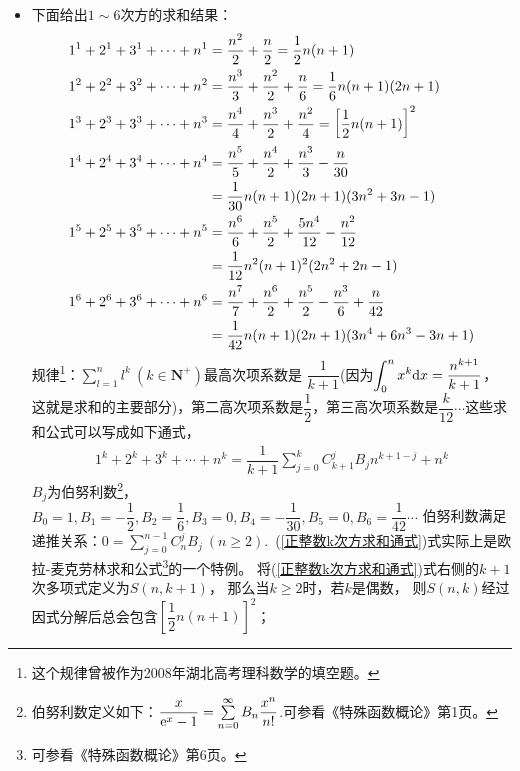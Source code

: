 \begin{itemize}[leftmargin=\inteval{\myitemleftmargin}pt,itemsep=
   \inteval{\myitemitempsep}pt,topsep=\inteval{\myitemtopsep}pt]
\item 下面给出$ 1\sim 6 $次方的求和结果：
\begin{align}
    1^1+2^1+3^1+\cdots +n^1 &=\dfrac{n^2}{2}+\dfrac{n}{2} =\dfrac{1}{2}n(n+1)
    \label{正整数1次方求和}\\
    1^2+2^2+3^2+\cdots +n^2&=\dfrac{n^3}{3}+\dfrac{n^2}{2}+\dfrac{n}{6}
    =\dfrac{1}{6}n(n+1)(2n+1)
    \label{正整数2次方求和} \\
    1^3+2^3+3^3+\cdots +n^3&=\dfrac{n^4}{4}+\dfrac{n^3}{2}+\dfrac{n^2}{4}=
    \left[\dfrac{1}{2}n(n+1) \right]^2 \label{正整数3次方求和}\\
    1^4+2^4+3^4+\cdots +n^4&=\dfrac{n^5}{5}+\dfrac{n^4}{2}+
    \dfrac{n^3}{3}-\dfrac{n}{30} 
            \label{正整数4次方求和} \\
    &=\dfrac{1}{30}n(n+1)(2n+1)(3n^2+3n-1) \notag\\
      1^5+2^5+3^5+\cdots +n^5&=\dfrac{n^6}{6}+\dfrac{n^5}{2}+
      \dfrac{5n^4}{12}-\dfrac{n^2}{12} \label{正整数5次方求和}\\
    &=\dfrac{1}{12}n^2(n+1)^2(2n^2+2n-1) \notag\\
    1^6+2^6+3^6+\cdots +n^6
    &=\dfrac{n^7}{7}+\dfrac{n^6}{2}+\dfrac{n^5}{2}-
    \dfrac{n^3}{6}+\dfrac{n}{42}
     \label{正整数6次方求和} \\
    &=\dfrac{1}{42}n(n+1)(2n+1)(3n^4+6n^3-3n+1)\notag 
\end{align}
规律\footnote{这个规律曾被作为2008年湖北高考理科数学的填空题。}：$ \sum\limits_{l=1}^{n} l^k \ (k\in \textbf{N}^+) $最高次项系数是
$ \dfrac{1}{k+1} $(因为$ \displaystyle \int_0^n x^k\mathrm{d} x=\dfrac{n^{k+1}}{k+1} $，
这就是求和的主要部分)，第二高次项系数是$ \dfrac{1}{2} $，第三高次项系数是$ \dfrac{k}{12} \cdots$这些求和公式可以写成如下通式，
\begin{align}\label{正整数k次方求和通式}
    1^k+2^k+3^k+\cdots +n^k=\dfrac{1}{k+1}
    \sum_{j=0}^{k}C_{k+1}^{j}B_{j}n^{k+1-j}+n^{k}
\end{align}
$ B_j $为伯努利数\footnote{伯努利数定义如下：$ \dfrac{x}{\mathrm{e}^x-1}=
    \sum\limits_{n=0}^{\infty}B_n\dfrac{x^n}{n!} $.可参看《特殊函数概论》第1页。}，
$ B_0=1,B_1=-\dfrac{1}{2},B_2=\dfrac{1}{6},B_3=0,B_4=-\dfrac{1}{30},
B_5=0,B_6=\dfrac{1}{42}\cdots$
伯努利数满足递推关系：$ 0=\sum\limits_{j=0}^{n-1}C_n^jB_j\ (n\geq 2) $.\ 
(\ref{正整数k次方求和通式})式实际上是欧拉-麦克劳林求和公式\footnote{可参看《特殊函数概论》第6页。}的一个特例。
将(\ref{正整数k次方求和通式})式右侧的$ k+1 $次多项式定义为$ S(n,k+1) $，
那么当$ k\geq 2 $时，若$k$是偶数，
则$ S(n,k) $经过因式分解后总会包含$ \left[\dfrac{1}{2}n(n+1)\right]^2 $；

\end{itemize}
